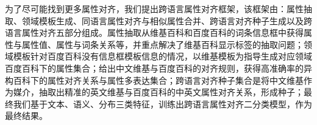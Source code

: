 为了尽可能找到更多属性对齐，我们提出跨语言属性对齐框架，该框架由：属性抽取、领域模板生成、同语言属性对齐与相似属性合并、跨语言对齐种子生成以及跨语言属性对齐五部分组成。属性抽取从维基百科和百度百科的词条信息框中获得属性与属性值、属性与词条关系等，并重点解决了维基百科显示标签的抽取问题；领域模板针对百度百科没有信息框模板信息的情况，以维基模板为指导生成对应领域百度百科下的属性集合；给出中文维基与百度百科的对齐规则，获得高准确率的异构百科下的属性对齐关系与属性多表达集合；跨语言对齐种子集合是将中文维基作为媒介，抽取出精准的英文维基与百度百科的中英文属性对齐关系，形成种子；最终我们基于文本、语义、分布三类特征，训练出跨语言属性对齐二分类模型，作为最终结果。

